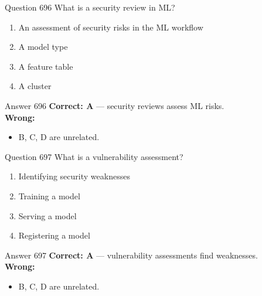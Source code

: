 \documentclass[aspectratio=169,11pt]{beamer}
\begin{document}
	\begin{frame}{Question 696}
		What is a security review in ML?
		\begin{enumerate}[label=\Alph*.]
			\item An assessment of security risks in the ML workflow
			\item A model type
			\item A feature table
			\item A cluster
		\end{enumerate}
	\end{frame}
	\begin{frame}{Answer 696}
		\textbf{Correct: A} --- security reviews assess ML risks.\\
		\vspace{0.5em}
		\textbf{Wrong:}
		\begin{itemize}
			\item B, C, D are unrelated.
		\end{itemize}
	\end{frame}
	
	\begin{frame}{Question 697}
		What is a vulnerability assessment?
		\begin{enumerate}[label=\Alph*.]
			\item Identifying security weaknesses
			\item Training a model
			\item Serving a model
			\item Registering a model
		\end{enumerate}
	\end{frame}
	\begin{frame}{Answer 697}
		\textbf{Correct: A} --- vulnerability assessments find weaknesses.\\
		\vspace{0.5em}
		\textbf{Wrong:}
		\begin{itemize}
			\item B, C, D are unrelated.
		\end{itemize}
	\end{frame}
	
\end{document}
